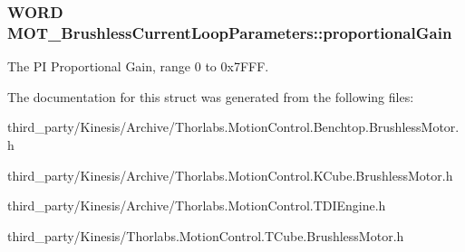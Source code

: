 \subsubsection[{\texorpdfstring{proportional\+Gain}{proportionalGain}}]{\setlength{\rightskip}{0pt plus 5cm}W\+O\+RD M\+O\+T\+\_\+\+Brushless\+Current\+Loop\+Parameters\+::proportional\+Gain}\hypertarget{struct_m_o_t___brushless_current_loop_parameters_a27542e753d8b6f8fb09747133d1f772e}{}\label{struct_m_o_t___brushless_current_loop_parameters_a27542e753d8b6f8fb09747133d1f772e}


The PI Proportional Gain, range 0 to 0x7\+F\+FF. 



The documentation for this struct was generated from the following files\+:\begin{DoxyCompactItemize}
\item 
third\+\_\+party/\+Kinesis/\+Archive/Thorlabs.\+Motion\+Control.\+Benchtop.\+Brushless\+Motor.\+h\item 
third\+\_\+party/\+Kinesis/\+Archive/Thorlabs.\+Motion\+Control.\+K\+Cube.\+Brushless\+Motor.\+h\item 
third\+\_\+party/\+Kinesis/\+Archive/Thorlabs.\+Motion\+Control.\+T\+D\+I\+Engine.\+h\item 
third\+\_\+party/\+Kinesis/Thorlabs.\+Motion\+Control.\+T\+Cube.\+Brushless\+Motor.\+h\end{DoxyCompactItemize}
